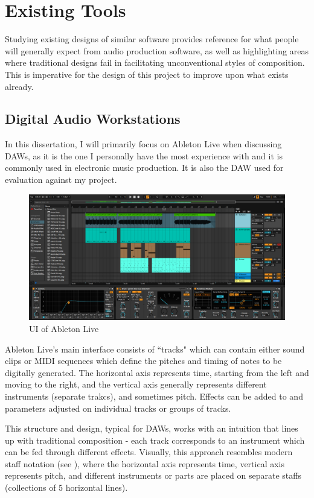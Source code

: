 \documentclass[12pt,a4paper,twoside,openright]{report}
\begin{document}
\section{Existing Tools}
Studying existing designs of similar software provides reference for what people will generally expect from audio production software, as well as highlighting areas where traditional designs fail in facilitating unconventional styles of composition. This is imperative for the design of this project to improve upon what exists already.

\subsection{Digital Audio Workstations}
In this dissertation, I will primarily focus on Ableton Live when discussing DAWs, as it is the one I personally have the most experience with and it is commonly used in electronic music production. It is also the DAW used for evaluation against my project.

\begin{figure}[h]
    \centering
    \includegraphics[scale=0.3]{images/ableton example.png}
    \caption{UI of Ableton Live}
    \label{fig:ableton}
\end{figure}

Ableton Live's main interface consists of ``tracks" which can contain either sound clips or MIDI sequences which define the pitches and timing of notes to be digitally generated. The horizontal axis represents time, starting from the left and moving to the right, and the vertical axis generally represents different instruments (separate trakcs), and sometimes pitch. Effects can be added to and parameters adjusted on individual tracks or groups of tracks. 

This structure and design, typical for DAWs, works with an intuition that lines up with traditional composition - each track corresponds to an instrument which can be fed through different effects. Visually, this approach resembles modern staff notation (see ), where the horizontal axis represents time, vertical axis represents pitch, and different instruments or parts are placed on separate staffs (collections of 5 horizontal lines).
\end{document}
